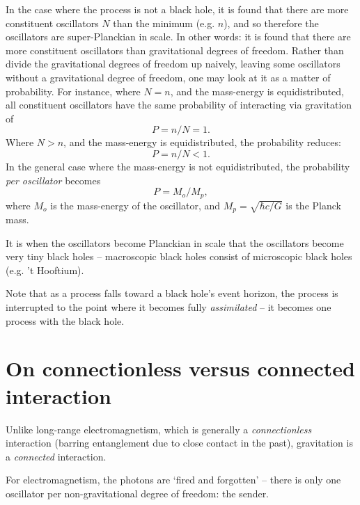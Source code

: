 \documentclass[12pt]{article}
\begin{document}
{In the case where the process is not a black hole, it is found that there are more constituent oscillators $N$ than the minimum (e.g. $n$), and so therefore the oscillators are super-Planckian in scale.
In other words: it is found that there are more constituent oscillators than gravitational degrees of freedom.
Rather than divide the gravitational degrees of freedom up naively, leaving some oscillators without a gravitational degree of freedom, one may look at it as a matter of probability.
For instance, where $N = n$, and the mass-energy is equidistributed, all constituent oscillators have the same probability of interacting via gravitation of
\begin{equation}
P = n/N = 1.
\end{equation}
Where $N > n$, and the mass-energy is equidistributed, the probability reduces:
\begin{equation}
P = n/N < 1.
\end{equation}
In the general case where the mass-energy is not equidistributed, the probability {\textit{per oscillator}} becomes 
\begin{equation}
P = M_o / M_p,
\end{equation} 
where $M_o$ is the mass-energy of the oscillator, and $M_p = \sqrt{\hbar c / G}$ is the Planck mass.

It is when the oscillators become Planckian in scale that the oscillators become very tiny black holes \cite{string} -- macroscopic black holes consist of microscopic black holes (e.g. 't Hooftium).

Note that as a process falls toward a black hole's event horizon, the process is interrupted to the point where it becomes fully {\textit{assimilated}} -- it becomes one process with the black hole.








\section{On connectionless versus connected interaction}

Unlike long-range electromagnetism, which is generally a {\textit{connectionless}} interaction (barring entanglement due to close contact in the past), gravitation is a {\textit{connected}} interaction.

For electromagnetism, the photons are `fired and forgotten' -- there is only one oscillator per non-gravitational degree of freedom: the sender.

}
\end{document}
